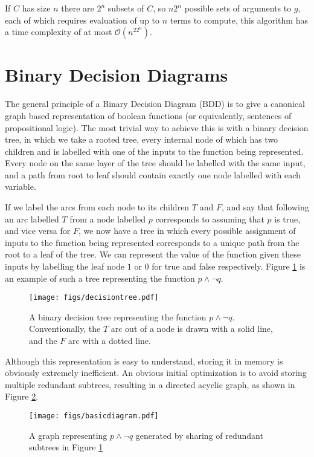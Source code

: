 \documentclass[12pt,a4paper,twoside,openright]{report}
\begin{document}
If $C$ has size $n$ there are $2^n$ subsets of $C$, so $n2^n$ possible sets of arguments to $g$, each of which requires evaluation of up to $n$ terms to compute, this algorithm has a time complexity of at most $\mathcal{O}(n^22^n)$.

\section{Binary Decision Diagrams}
The general principle of a Binary Decision Diagram (BDD) is to give a canonical graph based representation of boolean functions (or equivalently, sentences of propositional logic). The most trivial way to achieve this is with a binary decision tree, in which we take a rooted tree, every internal node of which has two children and is labelled with one of the inputs to the function being represented. Every node on the same layer of the tree should be labelled with the same input, and a path from root to leaf should contain exactly one node labelled with each variable.

If we label the arcs from each node to its children $T$ and $F$, and say that following an arc labelled $T$ from a node labelled $p$ corresponds to assuming that $p$ is true, and vice versa for $F$, we now have a tree in which every possible assignment of inputs to the function being represented corresponds to a unique path from the root to a leaf of the tree. We can represent the value of the function given these inputs by labelling the leaf node $1$ or $0$ for true and false respectively. Figure \ref{decisiontree} is an example of such a tree representing the function $p\wedge\neg q$.

\begin{figure}[tbh]
\centerline{\texttt{[image: figs/decisiontree.pdf]}}
\caption{A binary decision tree representing the function $p\wedge\neg q$. Conventionally, the $T$ arc out of a node is drawn with a solid line, and the $F$ arc with a dotted line.}
\label{decisiontree}
\end{figure}

Although this representation is easy to understand, storing it in memory is obviously extremely inefficient. An obvious initial optimization is to avoid storing multiple redundant subtrees, resulting in a directed acyclic graph, as shown in Figure \ref{basicdiagram}.

\begin{figure}[tbh]
\centerline{\texttt{[image: figs/basicdiagram.pdf]}}
\caption{A graph representing $p\wedge\neg q$ generated by sharing of redundant subtrees in Figure \ref{decisiontree}}
\label{basicdiagram}
\end{figure}
\end{document}

